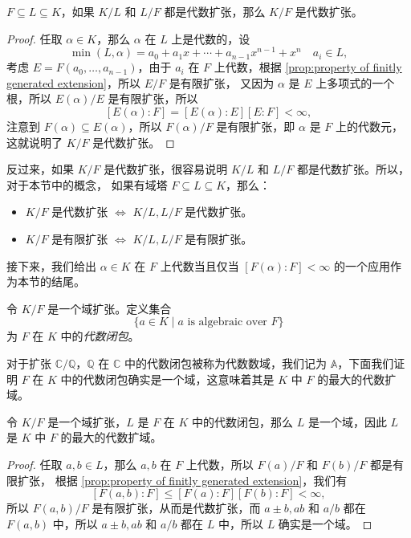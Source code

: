 \begin{theorem}
  $F\subseteq L\subseteq K$，如果 $K/L$ 和 $L/F$ 都是代数扩张，那么 $K/F$ 是代数扩张。
\end{theorem} 
\begin{proof}
  任取 $\alpha\in K$，那么 $\alpha$ 在 $L$ 上是代数的，设
  \[
    \min(L,\alpha)=a_0+a_1x+\cdots+a_{n-1}x^{n-1}+x^n\quad a_i\in L,  
  \]
  考虑 $E=F(a_0,\dots,a_{n-1})$，由于 $a_i$ 在 $F$ 上代数，根据
  \autoref{prop:property of finitly generated extension}，所以 $E/F$ 是有限扩张，
  又因为 $\alpha$ 是 $E$ 上多项式的一个根，所以 $E(\alpha)/E$ 是有限扩张，所以
  \[
    [E(\alpha):F]=[E(\alpha):E][E:F]  <\infty,
  \]
  注意到 $F(\alpha)\subseteq E(\alpha)$，所以 $F(\alpha)/F$ 是有限扩张，即 $\alpha$ 是
  $F$ 上的代数元，这就说明了 $K/F$ 是代数扩张。
\end{proof}

反过来，如果 $K/F$ 是代数扩张，很容易说明 $K/L$ 和 $L/F$ 都是代数扩张。所以，对于本节中的概念，
如果有域塔 $F\subseteq L\subseteq K$，那么：
\begin{itemize}
  \item $K/F$ 是代数扩张 $\Leftrightarrow$ $K/L,L/F$ 是代数扩张。
  \item $K/F$ 是有限扩张 $\Leftrightarrow$ $K/L,L/F$ 是有限扩张。
\end{itemize}

接下来，我们给出 $\alpha\in K$ 在 $F$ 上代数当且仅当 $[F(\alpha):F]<\infty$ 的一个应用作为本节的结尾。

\begin{definition}\label{def:closure of extension}
  令 $K/F$ 是一个域扩张。定义集合
  \[
    \{a\in K\mid \text{$a$ is algebraic over $F$}\}  
  \]
  为 $F$ 在 $K$ 中的\emph{代数闭包}。
\end{definition}

对于扩张 $\mathbb{C}/\mathbb{Q}$，$\mathbb{Q}$ 在 $\mathbb{C}$ 中的代数闭包被称为代数数域，我们记为
$\mathbb{A}$，下面我们证明 $F$ 在 $K$ 中的代数闭包确实是一个域，这意味着其是 $K$ 中 $F$ 的最大的代数扩域。

\begin{proposition}
  令 $K/F$ 是一个域扩张，$L$ 是 $F$ 在 $K$ 中的代数闭包，那么 $L$ 是一个域，因此 $L$
  是 $K$ 中 $F$ 的最大的代数扩域。
\end{proposition}
\begin{proof}
  任取 $a,b\in L$，那么 $a,b$ 在 $F$ 上代数，所以 $F(a)/F$ 和 $F(b)/F$ 都是有限扩张，
  根据 \autoref{prop:property of finitly generated extension}，我们有
  \[
    [F(a,b):F]\leq [F(a):F][F(b):F]<\infty,  
  \]
  所以 $F(a,b)/F$ 是有限扩张，从而是代数扩张，而 $a\pm b,ab$ 和 $a/b$ 都在 $F(a,b)$
  中，所以 $a\pm b,ab$ 和 $a/b$ 都在 $L$ 中，所以 $L$ 确实是一个域。
\end{proof}

